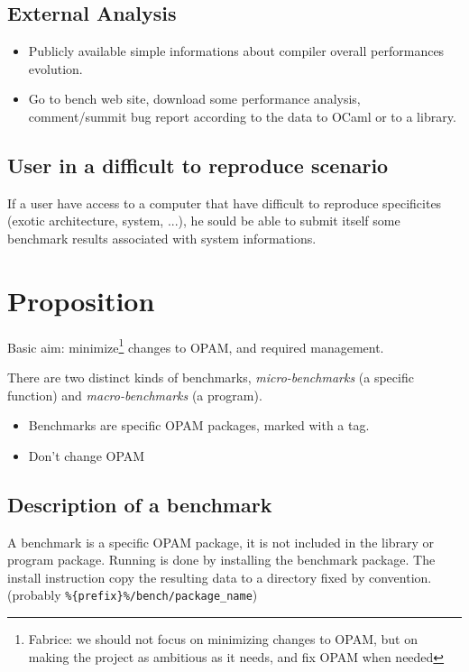 \documentclass[11pt,a4paper]{article}
\begin{document}
\subsection{External Analysis}

\begin{itemize}
\item
  Publicly available simple informations about compiler overall
  performances evolution.

\item
  Go to bench web site, download some performance analysis,
  comment/summit bug report according to the data to OCaml or to a
  library.

\end{itemize}


\subsection{User in a difficult to reproduce scenario}

If a user have access to a computer that have difficult to reproduce
specificites (exotic architecture, system, ...), he sould be able to
submit itself some benchmark results associated with system
informations.

\section{Proposition}

Basic aim: minimize\footnote{Fabrice: we should not focus on
  minimizing changes to OPAM, but on making the project as ambitious
  as it needs, and fix OPAM when needed} changes to OPAM, and required
management.

There are two distinct kinds of benchmarks, \emph{micro-benchmarks} (a specific
function) and \emph{macro-benchmarks} (a program).

\begin{itemize}
\item Benchmarks are specific OPAM packages, marked with a tag.
\item Don't change OPAM
\end{itemize}

\subsection{Description of a benchmark}

A benchmark is a specific OPAM package, it is not included in the
library or program package. Running is done by installing the
benchmark package. The install instruction copy the resulting data to
a directory fixed by convention. (probably
\texttt{\%\{prefix\}\%/bench/package\_name})
\end{document}

